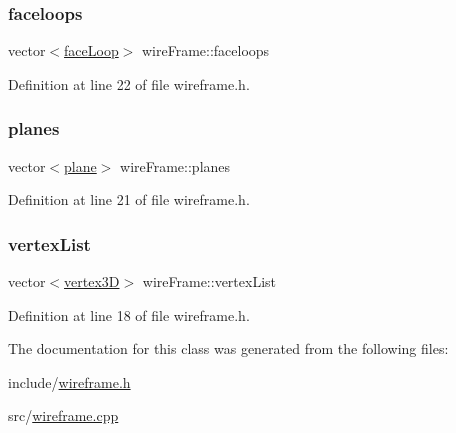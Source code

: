 \subsubsection{\texorpdfstring{faceloops}{faceloops}}
{\footnotesize\ttfamily vector$<$\mbox{\hyperlink{classface_loop}{face\+Loop}}$>$ wire\+Frame\+::faceloops}



Definition at line 22 of file wireframe.\+h.

\mbox{\label{classwire_frame_aa1e3ca4f8822ffc02447f9ba92542698}} 
\subsubsection{\texorpdfstring{planes}{planes}}
{\footnotesize\ttfamily vector$<$\mbox{\hyperlink{structplane}{plane}}$>$ wire\+Frame\+::planes}



Definition at line 21 of file wireframe.\+h.

\mbox{\label{classwire_frame_aa70e800c97cd01d6ae3e93246a5cbae7}} 
\subsubsection{\texorpdfstring{vertex\+List}{vertexList}}
{\footnotesize\ttfamily vector$<$\mbox{\hyperlink{structvertex3_d}{vertex3D}}$>$ wire\+Frame\+::vertex\+List}



Definition at line 18 of file wireframe.\+h.



The documentation for this class was generated from the following files\+:\begin{DoxyCompactItemize}
\item 
include/\mbox{\hyperlink{wireframe_8h}{wireframe.\+h}}\item 
src/\mbox{\hyperlink{wireframe_8cpp}{wireframe.\+cpp}}\end{DoxyCompactItemize}
